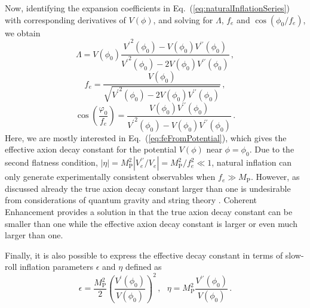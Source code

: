 \documentclass[12pt]{article}
\begin{document}
Now, identifying the expansion coefficients in Eq.~(\ref{eq:naturalInflationSeries}) with corresponding derivatives of $V\left(\phi\right)$, and solving for $\Lambda$, $f_e$ and $\cos\left(\phi_0 / f_e\right)$, we obtain
\begin{equation} \label{eq:lambdaFromPotential}
  \Lambda = V\left(\phi_0\right) \frac
    {{V^\prime}^2\left(\phi_0\right) - V\left(\phi_0\right) V^{\prime\prime}\left(\phi_0\right)}
    {{V^\prime}^2\left(\phi_0\right) - 2 V\left(\phi_0\right) V^{\prime\prime}\left(\phi_0\right)}
  \,,
\end{equation}
\begin{equation} \label{eq:feFromPotential}
  f_e = \frac
    {V\left(\phi_0\right)}
    {\sqrt{{V^\prime}^2\left(\phi_0\right)
      - 2 V\left(\phi_0\right) V^{\prime\prime}\left(\phi_0\right)}}\,,
\end{equation}
\begin{equation} \label{eq:fieldInitialFromPotential}
  \cos\left(\frac{\varphi_0}{f_e}\right) = \frac
    {V\left(\phi_0\right) V^{\prime\prime}\left(\phi_0\right)}
    {{V^\prime}^2\left(\phi_0\right) - V\left(\phi_0\right) V^{\prime\prime}\left(\phi_0\right)}\,.
\end{equation}
Here, we are mostly interested in Eq.~(\ref{eq:feFromPotential}), which gives the effective axion decay constant for the potential $V\left(\phi\right)$ near $\phi = \phi_0$.
Due to the second flatness condition, $\left|\eta\right| = M_\text{P}^2 \left|V_e^{\prime\prime} / V_e\right| = M_\text{P}^2 / f_e^2 \ll 1$, natural inflation can only generate experimentally consistent observables when $f_e \gg M_\text{P}$.
However, as discussed already the true axion decay constant larger than one is undesirable from considerations of quantum gravity and string theory \cite{Kallosh:1995hi, Banks:2003sx}.
Coherent Enhancement provides a solution in that the true axion decay constant can be smaller than one while the effective axion decay constant is larger or even much larger than one.

Finally, it is also possible to express the effective decay constant in terms of slow-roll inflation parameters $\epsilon$ and $\eta$ defined as
\begin{equation} \label{eq:epsEtaFromPotential}
  \epsilon =
    \frac{M_\text{P}^2}{2}
    \left(\frac{V^\prime\left(\phi_0\right)}{V\left(\phi_0\right)}\right)^2\,,
  ~~~ \eta = M_\text{P}^2 \frac{V^{\prime\prime}\left(\phi_0\right)}{V\left(\phi_0\right)}\,.
\end{equation}
\end{document}
